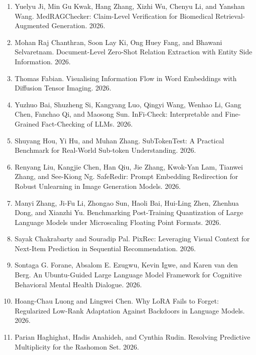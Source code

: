 \documentclass{article}
\begin{document}
\begin{enumerate}
\item
Yuelyu Ji, Min Gu Kwak, Hang Zhang, Xizhi Wu, Chenyu Li, and Yanshan Wang. MedRAGChecker: Claim-Level Verification for Biomedical Retrieval-Augmented Generation. 2026.
\item
Mohan Raj Chanthran, Soon Lay Ki, Ong Huey Fang, and Bhawani Selvaretnam. Document-Level Zero-Shot Relation Extraction with Entity Side Information. 2026.
\item
Thomas Fabian. Visualising Information Flow in Word Embeddings with Diffusion Tensor Imaging. 2026.
\item
Yuzhuo Bai, Shuzheng Si, Kangyang Luo, Qingyi Wang, Wenhao Li, Gang Chen, Fanchao Qi, and Maosong Sun. InFi-Check: Interpretable and Fine-Grained Fact-Checking of LLMs. 2026.
\item
Shuyang Hou, Yi Hu, and Muhan Zhang. SubTokenTest: A Practical Benchmark for Real-World Sub-token Understanding. 2026.
\item
Renyang Liu, Kangjie Chen, Han Qiu, Jie Zhang, Kwok-Yan Lam, Tianwei Zhang, and See-Kiong Ng. SafeRedir: Prompt Embedding Redirection for Robust Unlearning in Image Generation Models. 2026.
\item
Manyi Zhang, Ji-Fu Li, Zhongao Sun, Haoli Bai, Hui-Ling Zhen, Zhenhua Dong, and Xianzhi Yu. Benchmarking Post-Training Quantization of Large Language Models under Microscaling Floating Point Formats. 2026.
\item
Sayak Chakrabarty and Souradip Pal. PixRec: Leveraging Visual Context for Next-Item Prediction in Sequential Recommendation. 2026.
\item
Sontaga G. Forane, Absalom E. Ezugwu, Kevin Igwe, and Karen van den Berg. An Ubuntu-Guided Large Language Model Framework for Cognitive Behavioral Mental Health Dialogue. 2026.
\item
Hoang-Chau Luong and Lingwei Chen. Why LoRA Fails to Forget: Regularized Low-Rank Adaptation Against Backdoors in Language Models. 2026.
\item
Parian Haghighat, Hadis Anahideh, and Cynthia Rudin. Resolving Predictive Multiplicity for the Rashomon Set. 2026.
\end{enumerate}
\end{document}

